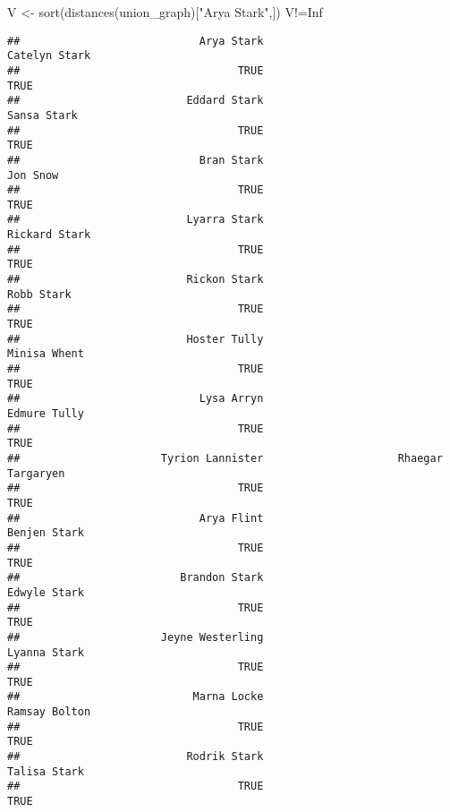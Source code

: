 \documentclass[
]{book}
\newenvironment{Shaded}{\begin{snugshade}}{\end{snugshade}}
\newcommand{\ConstantTok}[1]{\textcolor[rgb]{0.00,0.00,0.00}{#1}}
\newcommand{\FunctionTok}[1]{\textcolor[rgb]{0.00,0.00,0.00}{#1}}
\newcommand{\NormalTok}[1]{#1}
\newcommand{\OtherTok}[1]{\textcolor[rgb]{0.56,0.35,0.01}{#1}}
\newcommand{\SpecialCharTok}[1]{\textcolor[rgb]{0.00,0.00,0.00}{#1}}
\newcommand{\StringTok}[1]{\textcolor[rgb]{0.31,0.60,0.02}{#1}}
\begin{document}
\begin{Shaded}
\begin{Highlighting}[]
\NormalTok{V }\OtherTok{\textless{}{-}} \FunctionTok{sort}\NormalTok{(}\FunctionTok{distances}\NormalTok{(union\_graph)[}\StringTok{"Arya Stark"}\NormalTok{,])}
\NormalTok{V}\SpecialCharTok{!=}\ConstantTok{Inf}
\end{Highlighting}
\end{Shaded}

\begin{verbatim}
##                            Arya Stark                         Catelyn Stark 
##                                  TRUE                                  TRUE 
##                          Eddard Stark                           Sansa Stark 
##                                  TRUE                                  TRUE 
##                            Bran Stark                              Jon Snow 
##                                  TRUE                                  TRUE 
##                          Lyarra Stark                         Rickard Stark 
##                                  TRUE                                  TRUE 
##                          Rickon Stark                            Robb Stark 
##                                  TRUE                                  TRUE 
##                          Hoster Tully                          Minisa Whent 
##                                  TRUE                                  TRUE 
##                            Lysa Arryn                          Edmure Tully 
##                                  TRUE                                  TRUE 
##                      Tyrion Lannister                     Rhaegar Targaryen 
##                                  TRUE                                  TRUE 
##                            Arya Flint                          Benjen Stark 
##                                  TRUE                                  TRUE 
##                         Brandon Stark                          Edwyle Stark 
##                                  TRUE                                  TRUE 
##                      Jeyne Westerling                          Lyanna Stark 
##                                  TRUE                                  TRUE 
##                           Marna Locke                         Ramsay Bolton 
##                                  TRUE                                  TRUE 
##                          Rodrik Stark                          Talisa Stark 
##                                  TRUE                                  TRUE 

\end{verbatim}
\end{document}
